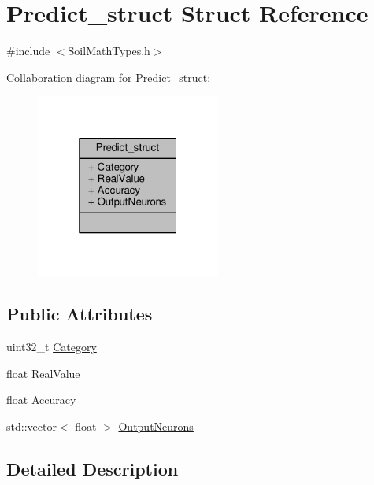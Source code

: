 \hypertarget{struct_predict__struct}{}\section{Predict\+\_\+struct Struct Reference}
\label{struct_predict__struct}


{\ttfamily \#include $<$Soil\+Math\+Types.\+h$>$}



Collaboration diagram for Predict\+\_\+struct\+:\nopagebreak
\begin{figure}[H]
\begin{center}
\leavevmode
\includegraphics[width=172pt]{struct_predict__struct__coll__graph}
\end{center}
\end{figure}
\subsection*{Public Attributes}
\begin{DoxyCompactItemize}
\item 
uint32\+\_\+t \hyperlink{struct_predict__struct_a9ec8092acf251221ad920454472f734b}{Category}
\item 
float \hyperlink{struct_predict__struct_a09932ff9ac15e4b182bf6e53232eba0f}{Real\+Value}
\item 
float \hyperlink{struct_predict__struct_a587f18ac05cd65437327a54261d1e22c}{Accuracy}
\item 
std\+::vector$<$ float $>$ \hyperlink{struct_predict__struct_aa0708cae93baa061f21452537e86d3bd}{Output\+Neurons}
\end{DoxyCompactItemize}


\subsection{Detailed Description}


